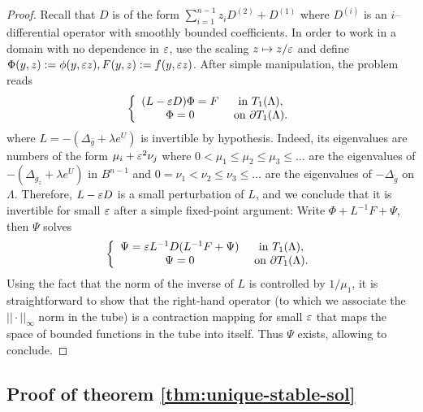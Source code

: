 \begin{proof}
    Recall that $D$ is of the form $\sum_{i=1}^{n-1} z_iD^{(2)}+D^{(1)}$ where
    $D^{(i)}$ is an $i$--differential operator with smoothly bounded
    coefficients. In order to work in a domain with no dependence in $\varepsilon$, use the
    scaling $z\mapsto z/\varepsilon$ and define $\Phi(y,z):=\phi(y,\varepsilon z),
    F(y,z):=f(y,\varepsilon z)$.
    After simple manipulation, the problem reads
    \begin{equation}
        \left\{
            \begin{array}{cc}
                (L-\varepsilon D)\Phi = F& \mbox{ in }T_1(\Lambda),\\
                \Phi=0 & \mbox{ on }\partial T_1(\Lambda).
            \end{array}
            \right.
    \end{equation}
    where $L=-(\Delta_{\bar g} + \lambda e^U)$ is invertible by hypothesis.
    Indeed, its eigenvalues are numbers of the form $\mu_i+\varepsilon^2 \nu_j$ where
    $0<\mu_1\leq \mu_2\leq \mu_3\leq \dots$ are the eigenvalues of
    $-(\Delta_{g_z}+\lambda e^U)$ in $B^{n-1}$ and $0=\nu_1<\nu_2\leq \nu_3\leq
    \dots$ are the eigenvalues of $-\Delta_{\mathring g}$ on $\Lambda$.
    Therefore, $L-\varepsilon D$ is a small perturbation of $L$, and we conclude that
    it is invertible for small $\varepsilon$ after a simple fixed-point argument:
    Write $\Phi+L^{-1}F+\Psi$, then $\Psi$ solves 
    \begin{equation}
        \left\{
            \begin{array}{cc}
                \Psi = \varepsilon L^{-1}D(L^{-1}F+\Psi)& \mbox{ in }T_1(\Lambda),\\
                \Psi=0 & \mbox{ on }\partial T_1(\Lambda).
            \end{array}
            \right.
    \end{equation}
    Using the fact that the norm of the inverse of $L$ is controlled by
    $1/\mu_1$, it is straightforward to show that the right-hand operator (to
    which we associate the $||\cdot||_\infty$ norm in the tube) is a
    contraction mapping for small $\varepsilon$ that maps the space of bounded
    functions in the tube into itself. Thus $\Psi$ exists, allowing to conclude.
\end{proof}


\subsection{Proof of theorem \ref{thm:unique-stable-sol}}

